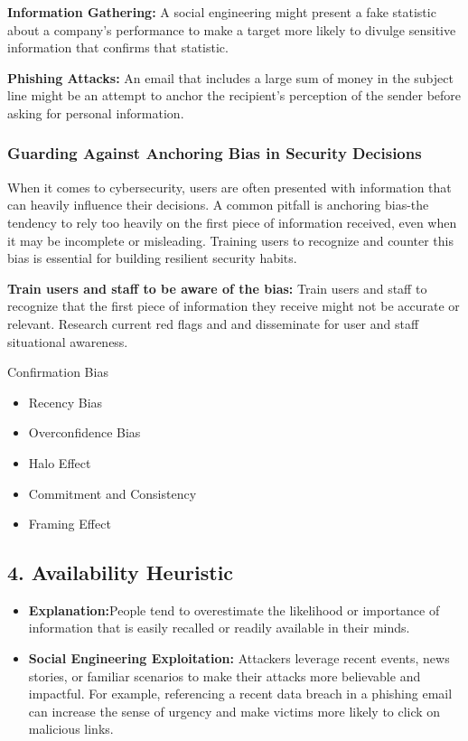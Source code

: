 \textbf{Information Gathering:}
A social engineering might present a fake statistic about a company's performance to make a target more likely to divulge sensitive information that confirms that statistic.

\textbf{Phishing Attacks:}
An email that includes a large sum of money in the subject line might be an attempt to anchor the recipient's perception of the sender before asking for personal information.

\subsubsection{Guarding Against Anchoring Bias in Security Decisions}
When it comes to cybersecurity, users are often presented with information that can heavily influence their decisions. A common pitfall is anchoring bias-the tendency to rely too heavily on the first piece of information received, even when it may be incomplete or misleading. Training users to recognize and counter this bias is essential for building resilient security habits.

\textbf{Train users and staff to be aware of the bias:} Train users and staff to recognize that the first piece of information they receive might not be accurate or relevant. Research current red flags and and disseminate for user and staff situational awareness. 







Confirmation Bias
    \begin{itemize}
    \item Recency Bias
    \item Overconfidence Bias
    \item Halo Effect
    \item Commitment and Consistency
    \item Framing Effect

\end{itemize}

\subsection{4. Availability Heuristic}
    \begin{itemize}
        \item \textbf{Explanation:}People tend to overestimate the likelihood or importance of information that is easily recalled or readily available in their minds.
        \item \textbf{Social Engineering Exploitation:} Attackers leverage recent events, news stories, or familiar scenarios to make their attacks more believable and impactful. For example, referencing a recent data breach in a phishing email can increase the sense of urgency and make victims more likely to click on malicious links.
    \end{itemize}

